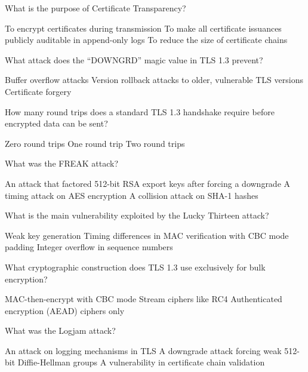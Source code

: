 \documentclass[10pt,a4paper,american]{exam}
\begin{document}
\begin{questions}
	\question What is the purpose of Certificate Transparency?
	\begin{randomizechoices}
		\choice To encrypt certificates during transmission
		\CorrectChoice To make all certificate issuances publicly auditable in append-only logs
		\choice To reduce the size of certificate chains
	\end{randomizechoices}

	\question What attack does the ``DOWNGRD'' magic value in TLS 1.3 prevent?
	\begin{randomizechoices}
		\choice Buffer overflow attacks
		\CorrectChoice Version rollback attacks to older, vulnerable TLS versions
		\choice Certificate forgery
	\end{randomizechoices}

	\question How many round trips does a standard TLS 1.3 handshake require before encrypted data can be sent?
	\begin{randomizechoices}
		\choice Zero round trips
		\CorrectChoice One round trip
		\choice Two round trips
	\end{randomizechoices}

	\question What was the FREAK attack?
	\begin{randomizechoices}
		\CorrectChoice An attack that factored 512-bit RSA export keys after forcing a downgrade
		\choice A timing attack on AES encryption
		\choice A collision attack on SHA-1 hashes
	\end{randomizechoices}

	\question What is the main vulnerability exploited by the Lucky Thirteen attack?
	\begin{randomizechoices}
		\choice Weak key generation
		\CorrectChoice Timing differences in MAC verification with CBC mode padding
		\choice Integer overflow in sequence numbers
	\end{randomizechoices}

	\question What cryptographic construction does TLS 1.3 use exclusively for bulk encryption?
	\begin{randomizechoices}
		\choice MAC-then-encrypt with CBC mode
		\choice Stream ciphers like RC4
		\CorrectChoice Authenticated encryption (AEAD) ciphers only
	\end{randomizechoices}

	\question What was the Logjam attack?
	\begin{randomizechoices}
		\choice An attack on logging mechanisms in TLS
		\CorrectChoice A downgrade attack forcing weak 512-bit Diffie-Hellman groups
		\choice A vulnerability in certificate chain validation
	\end{randomizechoices}


\end{questions}
\end{document}
